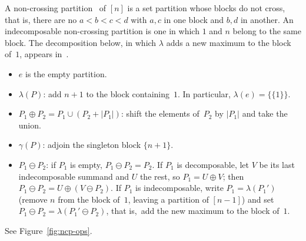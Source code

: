 \documentclass[a4paper,11pt]{article}
\theoremstyle{definition}
\begin{document}
A non-crossing partition~\cite{Kreweras72} of $[n]$ is a
set partition whose blocks do not cross, that is, there are no
$a < b < c < d$ with $a, c$ in one block and $b, d$ in
another. An indecomposable
non-crossing partition is one in which $1$ and $n$ belong
to the same block. The decomposition below, in which
$\lambda$ adds a new maximum to the block of~$1$,
appears in~\cite[Proposition~9.4]{NicaSpeicher06}.
\begin{itemize}
\item $e$ is the empty partition.
\item $\lambda(P)$: add $n{+}1$ to the block
  containing~$1$. In particular,
  $\lambda(e) = \{\{1\}\}$.
\item $P_1 \oplus P_2 = P_1 \cup (P_2 + |P_1|)$:
  shift the elements of~$P_2$ by $|P_1|$ and take the
  union.
\item $\gamma(P)$: adjoin the singleton block
  $\{n{+}1\}$.
\item $P_1 \ominus P_2$: if $P_1$ is empty, $P_1 \ominus P_2 = P_2$.
  If $P_1$ is decomposable, let $V$
  be its last indecomposable summand and $U$ the rest, so
  $P_1 = U \oplus V$; then
  $P_1 \ominus P_2 = U \oplus (V \ominus P_2)$. If $P_1$
  is indecomposable, write $P_1 = \lambda(P_1')$ (remove
  $n$ from the block of~$1$, leaving a partition of
  $[n{-}1]$) and set
  $P_1 \ominus P_2 = \lambda(P_1' \ominus P_2)$, that is,\
  add the new maximum to the block of~$1$.
\end{itemize}
See Figure~\ref{fig:ncp-ops}.
\end{document}
